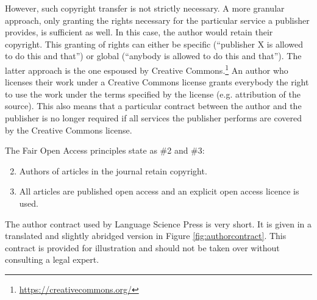 \documentclass[nonflat,smallfont
]{langsci/langscibook}
\newcommand{\footurl}[1]{\footnote{\url{#1}}}
\begin{document}
However, such copyright transfer is not strictly necessary. A more granular approach, only granting the rights necessary for the particular service a publisher provides, is sufficient as well. In this case, the author would retain their copyright. This granting of rights can either be specific (``publisher X is allowed to do this and that'') or global (``anybody is allowed to do this and that''). The latter approach is the one espoused by Creative Commons.\footurl{https://creativecommons.org/} An author who licenses their work under a Creative Commons license grants everybody the right to use the work under the terms specified by the license (e.g. attribution of the source). This also means that a particular contract between the author and the publisher is no longer required if all services the publisher performs are covered by the Creative Commons license. 

The Fair Open Access principles state as \#2 and \#3:

\begin{enumerate}
\setcounter{enumi}{1}
\item Authors of articles in the journal retain copyright.
\item All articles are published open access and an explicit open access licence is used.
\end{enumerate}

\noindent The author contract used by Language Science Press is very short. It is given in a translated and slightly abridged version in Figure \ref{fig:authorcontract}. This contract is provided for illustration and should not be taken over without consulting a legal expert.
\end{document}
